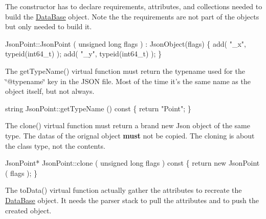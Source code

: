 The constructor has to declare requirements, attributes, and collections needed to build the \hyperlink{classHurricane_1_1DataBase}{Data\-Base} object. Note the the requirements are not part of the objects but only needed to build it.


\begin{DoxyCode}
JsonPoint::JsonPoint ( \textcolor{keywordtype}{unsigned} \textcolor{keywordtype}{long} flags )
  : JsonObject(flags)
\{
  add( \textcolor{stringliteral}{"\_x"}, \textcolor{keyword}{typeid}(int64\_t) );
  add( \textcolor{stringliteral}{"\_y"}, \textcolor{keyword}{typeid}(int64\_t) );
\}
\end{DoxyCode}


The {\ttfamily get\-Type\-Name()} virtual function must return the typename used for the {\ttfamily \char`\"{}@typename\char`\"{}} key in the J\-S\-O\-N file. Most of the time it's the same name as the object itself, but not always.


\begin{DoxyCode}
\textcolor{keywordtype}{string} JsonPoint::getTypeName ()\textcolor{keyword}{ const}
\textcolor{keyword}{}\{ \textcolor{keywordflow}{return} \textcolor{stringliteral}{"Point"}; \}
\end{DoxyCode}


The {\ttfamily clone()} virtual function must return a brand new Json object of the same type. The datas of the orignal object {\bfseries must} not be copied. The cloning is about the class type, not the contents.


\begin{DoxyCode}
JsonPoint* JsonPoint::clone ( \textcolor{keywordtype}{unsigned} \textcolor{keywordtype}{long} flags )\textcolor{keyword}{ const}
\textcolor{keyword}{}\{ \textcolor{keywordflow}{return} \textcolor{keyword}{new} JsonPoint ( flags ); \}
\end{DoxyCode}


The {\ttfamily to\-Data()} virtual function actually gather the attributes to recreate the \hyperlink{classHurricane_1_1DataBase}{Data\-Base} object. It needs the parser stack to pull the attributes and to push the created object.


